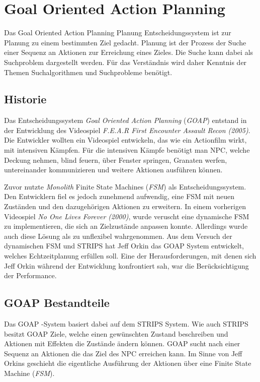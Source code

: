 \chapter{Goal Oriented Action Planning}

Das Goal Oriented Action Planning Planung Entscheidungssystem ist zur Planung zu einem bestimmten Ziel gedacht. Planung ist der Prozess der Suche einer Sequenz an Aktionen zur Erreichung eines Zieles. Die Suche kann dabei als Suchproblem dargestellt werden. Für das Verständnis wird daher Kenntnis der Themen Suchalgorithmen und Suchprobleme benötigt.



\section{Historie}

Das Entscheidungssystem \textit{Goal Oriented Action Planning} (\textit{GOAP}) entstand in der Entwicklung des Videospiel \textit{F.E.A.R First Encounter Assault Recon (2005)}. Die Entwickler wollten ein Videospiel entwickeln, das wie ein Actionfilm wirkt, mit intensiven Kämpfen. Für die intensiven Kämpfe benötigt man NPC, welche Deckung nehmen, blind feuern, über Fenster springen, Granaten werfen, untereinander kommunizieren und weitere Aktionen ausführen können.

Zuvor nutzte \textit{Monolith} Finite State Machines (\textit{FSM}) als Entscheidungssystem. Den Entwicklern fiel es jedoch zunehmend aufwendig, eine FSM mit neuen Zuständen und den dazugehörigen Aktionen zu erweitern. In einem vorherigen Videospiel \textit{No One Lives Forever (2000)}, wurde veruscht eine dynamische FSM zu implementieren, die sich an Zielzustände anpassen konnte. Allerdings wurde auch diese Lösung als zu unflexibel wahrgenommen. Aus dem Versuch der dynamischen FSM und STRIPS hat Jeff Orkin das GOAP System entwickelt, welches Echtzeitplanung erfüllen soll. Eine der Herausforderungen, mit denen sich Jeff Orkin während der Entwicklung konfrontiert sah, war die Berücksichtigung der Performance.\autocite{retro_fear}



\section{GOAP Bestandteile}

Das GOAP -System basiert dabei auf dem STRIPS System. Wie auch STRIPS besitzt GOAP Ziele, welche einen gewünschten Zustand beschreiben und Aktionen mit Effekten die Zustände ändern können. GOAP sucht nach einer Sequenz an Aktionen die das Ziel des NPC erreichen kann. Im Sinne von Jeff Orkins geschieht die eigentliche Ausführung der Aktionen über eine Finite State Machine (\textit{FSM}).


